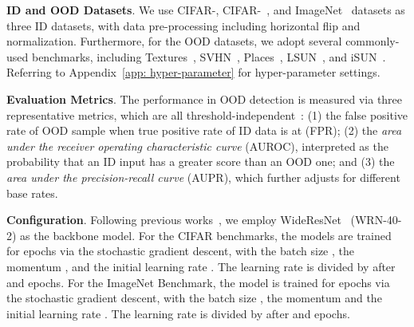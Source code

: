 \documentclass{article}
\begin{document}
\textbf{ID and OOD Datasets}. We use CIFAR-, CIFAR-~\cite{krizhevsky2009learning}, and ImageNet~\cite{ILSVRC15} datasets as three ID datasets, with data pre-processing including horizontal flip and normalization. Furthermore, for the OOD datasets, we adopt several commonly-used benchmarks, including Textures~\cite{cimpoi2014describing}, SVHN~\cite{netzer2011reading}, Places~\cite{ZhouLKO018}, LSUN~\cite{yu2015lsun}, and iSUN~\cite{xu2015turkergaze}. Referring to Appendix~\ref{app: hyper-parameter} for hyper-parameter settings. 


\textbf{Evaluation Metrics}. The performance in OOD detection is measured via three representative metrics, which are all threshold-independent~\cite{DavisG06}: (1) the false positive rate of OOD sample when true positive rate of ID data is at  (FPR); (2) the \emph{area under the receiver operating characteristic curve} (AUROC), interpreted as the probability that an ID input has a greater score than an OOD one; and (3) the \emph{area under the precision-recall curve} (AUPR), which further adjusts for different base rates.
 
\textbf{Configuration}. Following previous works~\cite{liu2020energy}, we employ WideResNet~\cite{zagoruyko2016wide} (WRN-40-2) as the backbone model. For the CIFAR benchmarks, the models are trained for  epochs via the stochastic gradient descent, with the batch size , the momentum , and the initial learning rate . The learning rate is divided by  after  and  epochs.  For the ImageNet Benchmark, the model is trained for  epochs via the stochastic gradient descent, with the batch size , the momentum  and the initial learning rate . The learning rate is divided by  after  and  epochs. 
\end{document}
